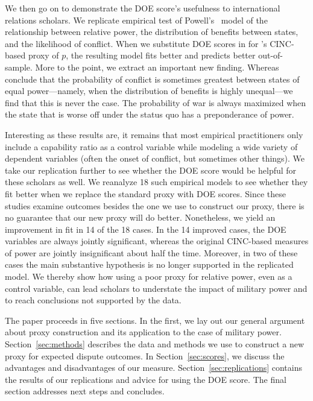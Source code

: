 We then go on to demonstrate the DOE score's usefulness to international relations scholars.
We replicate  empirical test of Powell's~\citeyearpar{powell1996stability,powell1999} model of the relationship between relative power, the distribution of benefits between states, and the likelihood of conflict.
When we substitute DOE scores in for \citeauthor{reed2008war}'s CINC-based proxy of $p$, the resulting model fits better and predicts better out-of-sample.
More to the point, we extract an important new finding.
Whereas \citeauthor{reed2008war} conclude that the probability of conflict is sometimes greatest between states of equal power---namely, when the distribution of benefits is highly unequal---we find that this is never the case.
The probability of war is always maximized when the state that is worse off under the status quo has a preponderance of power.

Interesting as these results are, it remains that most empirical practitioners only include a capability ratio as a control variable while modeling a wide variety of dependent variables (often the onset of conflict, but sometimes other things).
We take our replication further to see whether the DOE score would be helpful for these scholars as well.
We reanalyze 18 such empirical models to see whether they fit better when we replace the standard proxy with DOE scores.
Since these studies examine outcomes besides the one we use to construct our proxy, there is no guarantee that our new proxy will do better.
Nonetheless, we yield an improvement in fit in 14 of the 18 cases.
In the 14 improved cases, the DOE variables are always jointly significant, whereas the original CINC-based measures of power are jointly insignificant about half the time.
Moreover, in two of these cases the main substantive hypothesis is no longer supported in the replicated model.
We thereby show how using a poor proxy for relative power, even as a control variable, can lead scholars to understate the impact of military power and to reach conclusions not supported by the data.

The paper proceeds in five sections.
In the first, we lay out our general argument about proxy construction and its application to the case of military power.
Section~\ref{sec:methods} describes the data and methods we use to construct a new proxy for expected dispute outcomes.
In Section~\ref{sec:scores}, we discuss the advantages and disadvantages of our measure.
Section~\ref{sec:replications} contains the results of our replications and advice for using the DOE score.
The final section addresses next steps and concludes.

